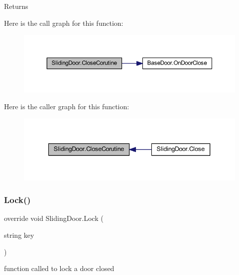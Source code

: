 \begin{DoxyReturn}{Returns}

\end{DoxyReturn}
Here is the call graph for this function\+:
\nopagebreak
\begin{figure}[H]
\begin{center}
\leavevmode
\includegraphics[width=350pt]{class_sliding_door_adcfa4000b6eafa6ec8b6ec335dbd5efe_cgraph}
\end{center}
\end{figure}
Here is the caller graph for this function\+:
\nopagebreak
\begin{figure}[H]
\begin{center}
\leavevmode
\includegraphics[width=340pt]{class_sliding_door_adcfa4000b6eafa6ec8b6ec335dbd5efe_icgraph}
\end{center}
\end{figure}
\mbox{\label{class_sliding_door_a2b21b6ea3181ac95520e0490c900d1a6}} 
\subsubsection{\texorpdfstring{Lock()}{Lock()}}
{\footnotesize\ttfamily override void Sliding\+Door.\+Lock (\begin{DoxyParamCaption}\item[{string}]{key }\end{DoxyParamCaption})\hspace{0.3cm}{\ttfamily [virtual]}}



function called to lock a door closed 


